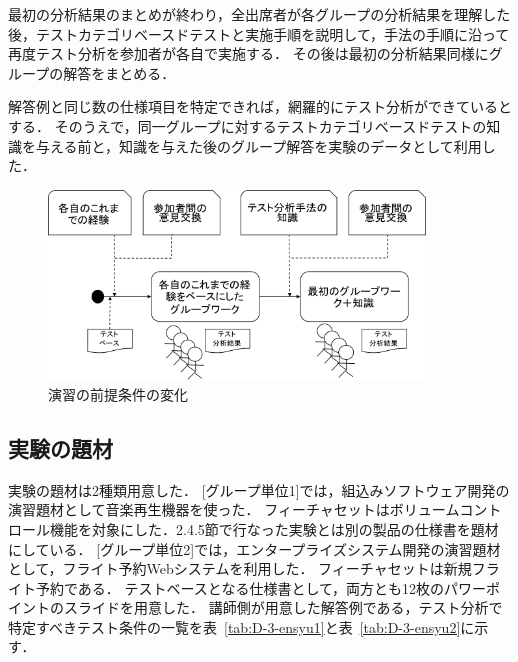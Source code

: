 最初の分析結果のまとめが終わり，全出席者が各グループの分析結果を理解した後，テストカテゴリベースドテストと実施手順を説明して，手法の手順に沿って再度テスト分析を参加者が各自で実施する．
その後は最初の分析結果同様にグループの解答をまとめる．

解答例と同じ数の仕様項目を特定できれば，網羅的にテスト分析ができているとする．
そのうえで，同一グループに対するテストカテゴリベースドテストの知識を与える前と，知識を与えた後のグループ解答を実験のデータとして利用した．
\begin{figure}[h]
\begin{center}
\includegraphics[width=10cm]{./image/D-3-ExparimentAbst1.png}
\caption{演習の前提条件の変化}
\label{fig:D-3-ExparimentAbst1}
\end{center}
\end{figure}

\subsection{実験の題材}
実験の題材は2種類用意した．
[グループ単位1]では，組込みソフトウェア開発の演習題材として音楽再生機器を使った．
フィーチャセットはボリュームコントロール機能を対象にした．2.4.5節で行なった実験とは別の製品の仕様書を題材にしている．
[グループ単位2]では，エンタープライズシステム開発の演習題材として，フライト予約Webシステムを利用した．
フィーチャセットは新規フライト予約である．
テストベースとなる仕様書として，両方とも12枚のパワーポイントのスライドを用意した．
講師側が用意した解答例である，テスト分析で特定すべきテスト条件の一覧を表~\ref{tab:D-3-ensyu1}と表~\ref{tab:D-3-ensyu2}に示す．

